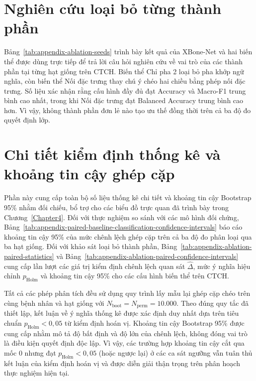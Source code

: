 \section{Nghiên cứu loại bỏ từng thành phần}

Bảng~\ref{tab:appendix-ablation-seeds} trình bày kết quả của XBone-Net và hai biến thể được dùng trực tiếp để trả lời câu hỏi nghiên cứu về vai trò của các thành phần tại từng hạt giống trên CTCH. Biến thể Chỉ pha 2 loại bỏ pha khớp ngữ nghĩa, còn biến thể Nối đặc trưng thay chú ý chéo hai chiều bằng phép nối đặc trưng. Số liệu xác nhận rằng cấu hình đầy đủ đạt Accuracy và Macro-F1 trung bình cao nhất, trong khi Nối đặc trưng đạt Balanced Accuracy trung bình cao hơn. Vì vậy, không thành phần đơn lẻ nào tạo ưu thế đồng thời trên cả ba độ đo quyết định lớp.



\section{Chi tiết kiểm định thống kê và khoảng tin cậy ghép cặp}
\label{sec:appendix_paired_statistics_and_ci}

Phần này cung cấp toàn bộ số liệu thống kê chi tiết và khoảng tin cậy Bootstrap 95\% nhằm đối chiếu, bổ trợ cho các biểu đồ trực quan đã trình bày trong Chương~\ref{Chapter4}. Đối với thực nghiệm so sánh với các mô hình đối chứng, Bảng~\ref{tab:appendix-paired-baseline-classification-confidence-intervals} báo cáo khoảng tin cậy 95\% của mức chênh lệch ghép cặp trên cả ba độ đo phân loại qua ba hạt giống. Đối với khảo sát loại bỏ thành phần, Bảng~\ref{tab:appendix-ablation-paired-statistics} và Bảng~\ref{tab:appendix-ablation-paired-confidence-intervals} cung cấp lần lượt các giá trị kiểm định chênh lệch quan sát $\widehat{\Delta}$, mức ý nghĩa hiệu chỉnh $p_{\mathrm{Holm}}$ và khoảng tin cậy 95\% cho các cấu hình biến thể trên CTCH.

Tất cả các phép phân tích đều sử dụng quy trình lấy mẫu lại ghép cặp chéo trên cùng bệnh nhân và hạt giống với $N_{\mathrm{boot}} = N_{\mathrm{perm}} = 10.000$. Theo đúng quy tắc đã thiết lập, kết luận về ý nghĩa thống kê được xác định duy nhất dựa trên tiêu chuẩn $p_{\mathrm{Holm}} < 0{,}05$ từ kiểm định hoán vị. Khoảng tin cậy Bootstrap 95\% được cung cấp nhằm mô tả độ bất định và độ lớn của chênh lệch, không đóng vai trò là điều kiện quyết định độc lập. Vì vậy, các trường hợp khoảng tin cậy cắt qua mốc 0 nhưng đạt $p_{\mathrm{Holm}} < 0{,}05$ (hoặc ngược lại) ở các ca sát ngưỡng vẫn tuân thủ kết luận của kiểm định hoán vị và được diễn giải thận trọng trên phân hoạch thực nghiệm hiện tại.

